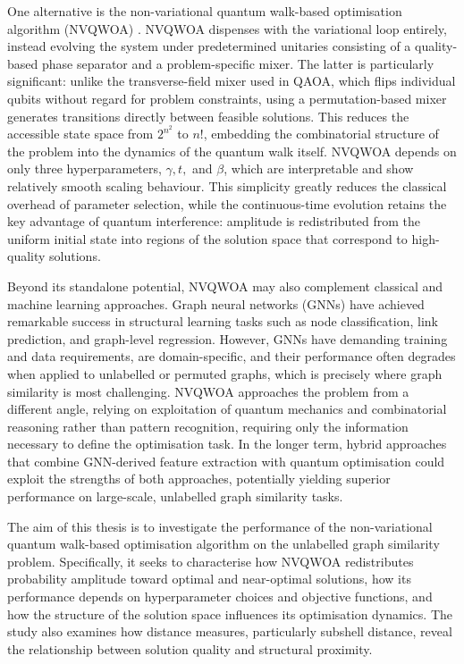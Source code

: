 One alternative is the non-variational quantum walk-based optimisation algorithm (NVQWOA) \cite{bennett2024nonvariational,bennett2024analysisnonvariationalquantumwalkbased}. NVQWOA dispenses with the variational loop entirely, instead evolving the system under predetermined unitaries consisting of a quality-based phase separator and a problem-specific mixer. The latter is particularly significant: unlike the transverse-field mixer used in QAOA, which flips individual qubits without regard for problem constraints, using a permutation-based mixer generates transitions directly between feasible solutions. This reduces the accessible state space from $2^{n^2}$ to $n!$, embedding the combinatorial structure of the problem into the dynamics of the quantum walk itself. NVQWOA depends on only three hyperparameters, $\gamma, t,$ and $\beta$, which are interpretable and show relatively smooth scaling behaviour. This simplicity greatly reduces the classical overhead of parameter selection, while the continuous-time evolution retains the key advantage of quantum interference: amplitude is redistributed from the uniform initial state into regions of the solution space that correspond to high-quality solutions.

Beyond its standalone potential, NVQWOA may also complement classical and machine learning approaches. Graph neural networks (GNNs) have achieved remarkable success in structural learning tasks such as node classification, link prediction, and graph-level regression\cite{gnn_review}. However, GNNs have demanding training and data requirements, are domain-specific, and their performance often degrades when applied to unlabelled or permuted graphs, which is precisely where graph similarity is most challenging. NVQWOA approaches the problem from a different angle, relying on exploitation of quantum mechanics and combinatorial reasoning rather than pattern recognition, requiring only the information necessary to define the optimisation task. In the longer term, hybrid approaches that combine GNN-derived feature extraction with quantum optimisation could exploit the strengths of both approaches, potentially yielding superior performance on large-scale, unlabelled graph similarity tasks.

The aim of this thesis is to investigate the performance of the non-variational quantum walk-based optimisation algorithm on the unlabelled graph similarity problem. Specifically, it seeks to characterise how NVQWOA redistributes probability amplitude toward optimal and near-optimal solutions, how its performance depends on hyperparameter choices and objective functions, and how the structure of the solution space influences its optimisation dynamics. The study also examines how distance measures, particularly subshell distance, reveal the relationship between solution quality and structural proximity.

